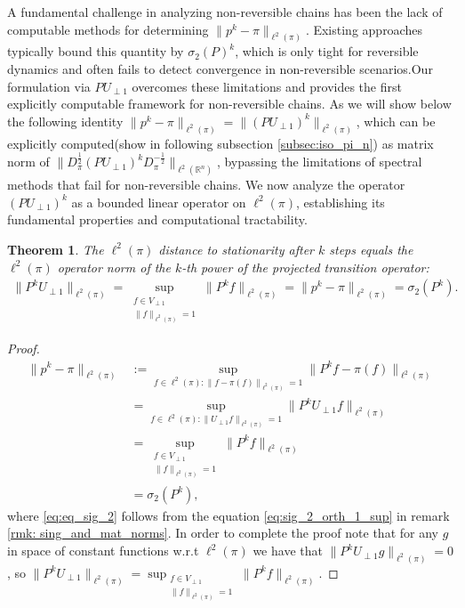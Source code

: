\documentclass[preprint]{imsart}
\theoremstyle{plain}
\newtheorem{theorem}{Theorem}[section]
\theoremstyle{definition}
\begin{document}
A fundamental challenge in analyzing non-reversible chains has been the lack of 
computable methods for determining $\|p^k - \pi\|_{\ell^{2}(\pi)}$. Existing 
approaches typically bound this quantity by $\sigma_2(P)^k$, which is only 
tight for reversible dynamics and often fails to detect convergence in 
non-reversible scenarios.Our formulation via $PU_{\perp 1}$ overcomes these 
limitations and provides the first explicitly computable framework for non-reversible chains. As we will show below the following identity $\|p^k - \pi\|_{\ell^{2}(\pi)} = \|(PU_{\perp 1})^k\|_{\ell^2(\pi)}$, which can be explicitly computed(show in following subsection \ref{subsec:iso_pi_n}) as matrix norm of $\|D_{\pi}^{\frac{1}{2}}(PU_{\perp 1})^{k}D_{\pi}^{-\frac{1}{2}}\|_{\ell^{2}(\mathbb{R}^{n})}$, bypassing the limitations of spectral methods that fail for non-reversible chains.
We now analyze the operator $(PU_{\perp 1})^{k}$ as a bounded linear operator 
on $\ell^{2}(\pi)$, establishing its fundamental properties and computational 
tractability.
\begin{theorem}
\label{thm:var_l2_proj}
The $\ell^{2}(\pi)$ distance to stationarity after $k$ steps equals the $\ell^{2}(\pi)$ operator norm of the $k$-th power of the projected transition operator:
\begin{align}
\label{eq:norm_proj=sig_2}
\|P^{k} U_{\perp 1}\|_{\ell^{2}(\pi)}
  = \sup_{\substack{f \in V_{\perp 1}\\ \|f\|_{\ell^{2}(\pi)}=1}}
      \|P^{k} f\|_{\ell^{2}(\pi)}
  = \|p^{k} - \pi\|_{\ell^{2}(\pi)}=\sigma_{2}(P^{k}).
\end{align}
\end{theorem}
\begin{proof}
    \begin{align}
        \|p^{k}-\pi\|_{\ell^{2}(\pi)} & \nonumber :=\sup_{f \in \ell^{2}(\pi):\|f-\pi(f)\|_{\ell^{2}(\pi)}=1} \big\|P^{k}f-\pi(f)\big\|_{\ell^{2}(\pi)}\\ & \nonumber= \sup_{f\in \ell^{2}(\pi):\|U_{\perp 1}f\|_{\ell^{2}(\pi)}=1}\|P^{k}U_{\perp 1}f\|_{\ell^{2}(\pi)} \\ & \nonumber = \sup_{\substack{f \in V_{\perp 1}\\ \|f\|_{\ell^{2}(\pi)}=1}}\|P^{k} f\|_{\ell^{2}(\pi)} \\ & \label{eq:eq_sig_2} = \sigma_{2}(P^{k}),
    \end{align}
where \eqref{eq:eq_sig_2} follows from the equation \eqref{eq:sig_2_orth_1_sup} in remark \ref{rmk: sing_and_mat_norms}. In order to complete the proof note that for any $g$ in space of constant functions w.r.t $\ell^{2}(\pi)$ we have that $\|P^{k}U_{\perp 1}g\|_{\ell^{2}(\pi)}=0$, so $\|P^{k} U_{\perp 1}\|_{\ell^{2}(\pi)}= \sup_{\substack{f \in V_{\perp 1}\\ \|f\|_{\ell^{2}(\pi)}=1}}\|P^{k} f\|_{\ell^{2}(\pi)}$.      
\end{proof}
\end{document}

